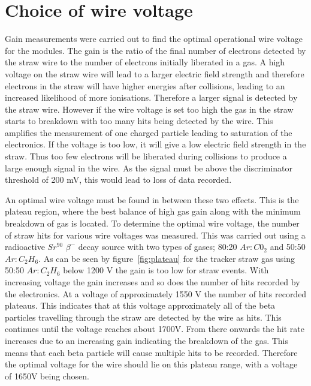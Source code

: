 \section{Choice of wire voltage}

Gain measurements were carried out to find the optimal operational wire voltage for the modules. The gain is the ratio of the final number of electrons detected by the straw wire to the number of electrons initially liberated in a gas. A high voltage on the straw wire will lead to a larger electric field strength and therefore electrons in the straw will have higher energies after collisions, leading to an increased likelihood of more ionisations. Therefore a larger signal is detected by the straw wire. However if the wire voltage is set too high the gas in the straw starts to breakdown with too many hits being detected by the wire. This amplifies the measurement of one charged particle leading to saturation of the electronics. If the voltage is too low, it will give a low electric field strength in the straw. Thus too few electrons will be liberated during collisions to produce a large enough signal in the wire. As the signal must be above the discriminator threshold of 200 mV, this would lead to loss of data recorded.

An optimal wire voltage must be found in between these two effects. This is the plateau region, where the best balance of high gas gain along with the minimum breakdown of gas is located. To determine the optimal wire voltage, the number of straw hits for various wire voltages was measured. This was carried out using a radioactive $Sr^{90}$ $\beta^-$ decay source with two types of gases; 80:20 $Ar:C0_{2}$ and 50:50 $Ar:C_{2}H_{6}$. As can be seen by figure~\ref{fig:plateau} for the tracker straw gas using 50:50 $Ar:C_{2}H_{6}$ below 1200 V the gain is too low for straw events. With increasing voltage the gain increases and so does the number of hits recorded by the electronics. At a voltage of approximately 1550 V the number of hits recorded plateaus. This indicates that at this voltage approximately all of the beta particles travelling through the straw are detected by the wire as hits. This continues until the voltage reaches about 1700V. From there onwards the hit rate increases due to an increasing gain indicating the breakdown of the gas. This means that each beta particle will cause multiple hits to be recorded. Therefore the optimal voltage for the wire should lie on this plateau range, with a voltage of 1650V being chosen.

